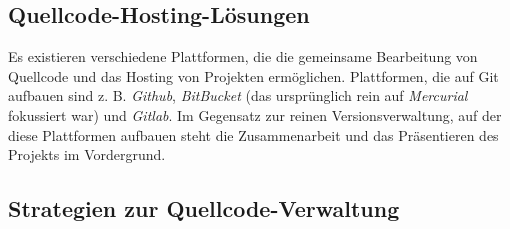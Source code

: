 \subsection{Quellcode-Hosting-Lösungen}
\label{sec:implementierung:hosting}
Es existieren verschiedene Plattformen, die die gemeinsame Bearbeitung von Quellcode und das Hosting von Projekten ermöglichen. Plattformen, die auf Git aufbauen sind z. B. \emph{Github}, \emph{BitBucket} (das ursprünglich rein auf \emph{Mercurial} fokussiert war) und \emph{Gitlab}. Im Gegensatz zur reinen Versionsverwaltung, auf der diese Plattformen aufbauen steht die Zusammenarbeit und das Präsentieren des Projekts im Vordergrund.


\subsection{Strategien zur Quellcode-Verwaltung}
\label{sec:implementierung:workflows}

